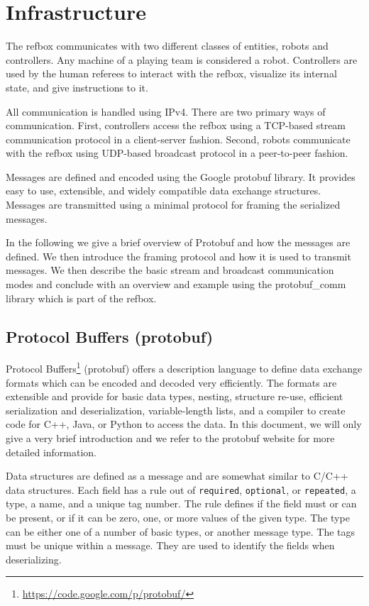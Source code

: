 \documentclass[a4paper]{article}
\begin{document}
\section{Infrastructure}
\label{sec:infrastructure}
The refbox communicates with two different classes of entities, robots
and controllers. Any machine of a playing team is considered a
robot. Controllers are used by the human referees to interact with the
refbox, visualize its internal state, and give instructions to it.

All communication is handled using IPv4. There are two primary ways of
communication. First, controllers access the refbox using a TCP-based
stream communication protocol in a client-server fashion. Second,
robots communicate with the refbox using UDP-based broadcast protocol
in a peer-to-peer fashion.

Messages are defined and encoded using the Google protobuf library. It
provides easy to use, extensible, and widely compatible data exchange
structures. Messages are transmitted using a minimal protocol for
framing the serialized messages.

In the following we give a brief overview of Protobuf and how the
messages are defined. We then introduce the framing protocol and how
it is used to transmit messages. We then describe the basic stream and
broadcast communication modes and conclude with an overview and
example using the protobuf\_comm library which is part of the refbox.

\subsection{Protocol Buffers (protobuf)}
Protocol
Buffers\footnote{\url{https://code.google.com/p/protobuf/}\label{fn:protobuf}}
(protobuf) offers a description language to define data exchange
formats which can be encoded and decoded very efficiently. The formats
are extensible and provide for basic data types, nesting, structure
re-use, efficient serialization and deserialization, variable-length
lists, and a compiler to create code for C++, Java, or Python to
access the data. In this document, we will only give a very brief
introduction and we refer to the protobuf website
for more detailed information.

Data structures are defined as a message and are somewhat similar to
C/C++ data structures. Each field has a rule out of \texttt{required},
\texttt{optional}, or \texttt{repeated}, a type, a name, and a unique
tag number. The rule defines if the field must or can be present, or
if it can be zero, one, or more values of the given type. The type can
be either one of a number of basic types, or another message type. The
tags must be unique within a message. They are used to identify the
fields when deserializing.
\end{document}
